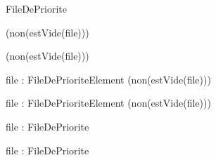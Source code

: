 \begin{algorithme}
    {}{FileDePriorite}

    {}
    {}

    {}
    {(non(estVide(file)))}

    {}
    {(non(estVide(file)))}

    {file : FileDePriorite}{Element}
    {(non(estVide(file)))}

    {file : FileDePriorite}{Element}
    {(non(estVide(file)))}

    {file : FileDePriorite}{\booleen}

    {file : FileDePriorite}{\naturelNonNul}

\end{algorithme}
